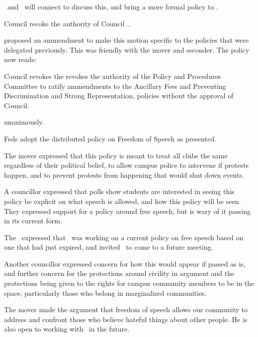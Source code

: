 \begin{motion}
\begin{information}
    \jason\ and \brian\ will connect to discuss this, and bring a more formal
    policy to \ppc.

\end{information}

\begin{motion}

    \birt Council recoke the authority of Council ..
    \movers{\seneca}{\brian}


    \tristan proposed an ammendment to make this motion specific to the policies
    that were delegated previously. This was friendly with the mover and 
    seconder. The policy now reads:

    \birt Council revokes the revokes the authority of the Policy and Procedures
    Committee to ratify ammendments to the Ancillary Fees and Preventing Discrimination
    and Strong Representation, policies without 
    the approval of Council. 

    \carries unanimously. 

\end{motion}

\begin{motion}
    \birt Feds adopt the distributed policy on Freedom of Speech as presented. 
    \movers{\alex}{\brian}

    The mover expressed that this policy is meant to treat all clubs the
    same regardless of their political belief, to allow campus police to
    intervene if protests happen, and to prevent protests from happening
    that would shut down events. 

    A councillor expressed that polls show students are interested in seeing
    this policy be explicit on what speech is allowed, and how this policy
    will be seen. They expressed support for a policy around free speech, but
    is wary of it passing in its current form. 

    The \pres\ expressed that \ppc\ was working on a current policy on 
    free speech based on one that had just expired, and invited \alex\ to
    come to a future meeting. 

    Another councillor expressed concern for how this would appear if passed
    as is, and further concern for the protections around civility in argument
    and the protections being given to the rights for campus community members
    to be in the space, particularly those who belong in marginalized 
    communities. 

    The mover made the argument that freedom of speech allows our community 
    to address and confront those who believe hateful things about other 
    people. He is also open to working with \ppc\ in the future. 


\end{motion}
\end{motion}
